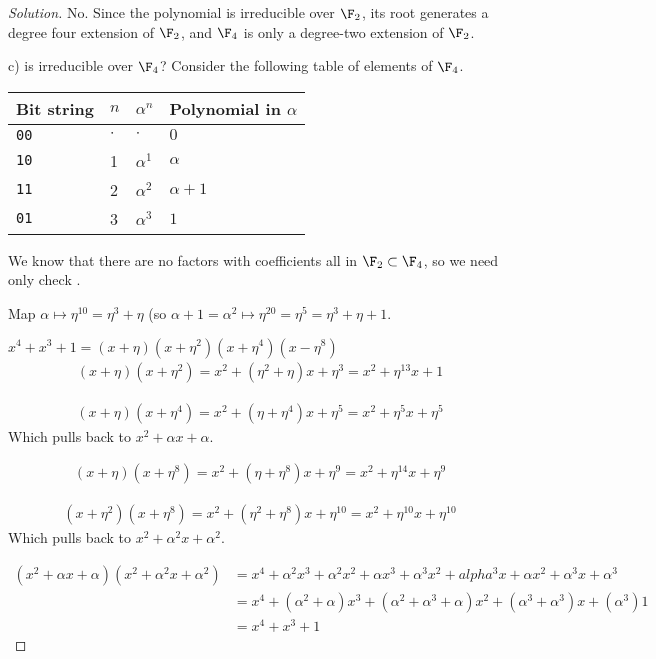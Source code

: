 \begin{proof}[Solution]
{\color{blue} No. Since the polynomial is irreducible over $\F_2$, its root generates a degree four extension of $\F_2$, and $\F_4$ is only a degree-two extension of $\F_2$.}

c) is irreducible over $\F_4$?
Consider the following table of elements of $\F_4$.
\begin{tabular}{l|l|l|l}
Bit string & $n$ & $\alpha^n$ & Polynomial in $\alpha$\\
\hline
\texttt{00} & $\cdot$ & $\cdot$ & $0$\\
\texttt{10} & 1 & $\alpha^1$ & $\alpha$\\
\texttt{11} & 2 & $\alpha^2$ & $\alpha + 1$\\
\texttt{01} & 3 & $\alpha^3$ & $1$
\end{tabular}

We know that there are no factors with coefficients all in $\F_2 \subset \F_4$, so we need only check .

Map $\alpha \mapsto \eta^{10} = \eta^3 + \eta$ (so $\alpha + 1 = \alpha^2 \mapsto \eta^{20} = \eta^{5} = \eta^3 + \eta + 1$.

$x^4 + x^3 + 1 = (x + \eta)(x + \eta^{2})(x + \eta^{4})(x - \eta^{8})$
\begin{align*}
(x + \eta)(x + \eta^2) = x^2 + (\eta^2 + \eta) x + \eta^3 = x^2 + \eta^{13} x + 1  
\end{align*}


\begin{align*}
(x + \eta)(x + \eta^4) = x^2 + (\eta + \eta^4) x + \eta^5 = x^2 + \eta^5 x + \eta^5
\end{align*}
Which pulls back to $x^2 + \alpha x + \alpha$.

\begin{align*}
(x + \eta)(x + \eta^8) = x^2 + (\eta + \eta^8)x + \eta^9 = x^2 + \eta^{14} x + \eta^9
\end{align*}

\begin{align*}
(x + \eta^2)(x + \eta^8) = x^2 + (\eta^2 + \eta^8) x + \eta^{10} = x^2 + \eta^{10} x + \eta^{10}
\end{align*}
Which pulls back to $x^2 + \alpha^2 x + \alpha^2$.

\begin{align*}
(x^2 + \alpha x + \alpha)(x^2 + \alpha^2 x + \alpha^2) 
&= x^4 + \alpha^2 x^3 + \alpha^2 x^2 + \alpha x^3 + \alpha^3 x^2 + alpha^3 x +     
   \alpha x^2 + \alpha^3 x + \alpha^3\\
&= x^4 + (\alpha^2 + \alpha) x^3 + (\alpha^2 + \alpha^3 + \alpha) x^2 + (\alpha^3 + \alpha^3) x + (\alpha^3) 1\\
&= x^4 + x^3 + 1
\end{align*}


\end{proof}
